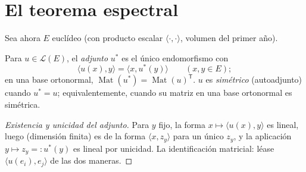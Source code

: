 \section{El teorema espectral}

Sea ahora $E$ euclídeo (con producto escalar
$\langle\cdot,\cdot\rangle$, volumen del primer año).

\begin{definition}\label{def:b2:quadratic:adjoint}
Para $u \in \mathcal{L}(E)$, el \emph{adjunto} $u^*$
es el único endomorfismo con
\[
\langle u(x), y\rangle = \langle x, u^*(y)\rangle
\qquad (x, y \in E);
\]
en una base ortonormal, $\operatorname{Mat}(u^*) =
\operatorname{Mat}(u)^{\mathsf T}$. $u$ es
\emph{simétrico} (autoadjunto) cuando
$u^* = u$; equivalentemente, cuando su matriz en una base ortonormal
es simétrica.
\end{definition}

\begin{proof}[Existencia y unicidad del adjunto]
Para $y$ fijo, la forma $x \mapsto \langle u(x), y\rangle$ es
lineal, luego (dimensión finita) es de la forma $\langle x,
z_y\rangle$ para un único $z_y$, y la aplicación $y \mapsto z_y =:
u^*(y)$ es lineal por unicidad. La identificación matricial: léase
$\langle u(e_i), e_j\rangle$ de las dos maneras.
\end{proof}

